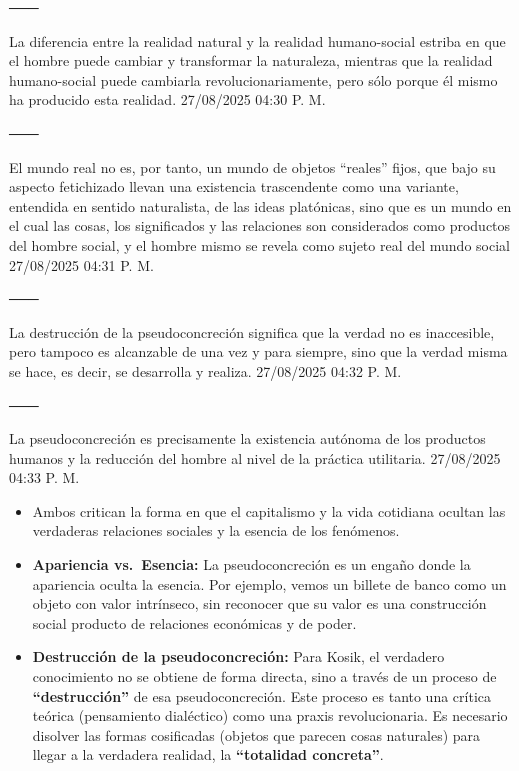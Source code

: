\documentclass[
  letterpaper,
  DIV=11,
  numbers=noendperiod]{scrreprt}
\providecommand{\tightlist}{%
  \setlength{\itemsep}{0pt}\setlength{\parskip}{0pt}}\usepackage{longtable,booktabs,array}
\begin{document}
───

La diferencia entre la realidad natural y la realidad humano-social
estriba en que el hombre puede cambiar y transformar la naturaleza,
mientras que la realidad humano-social puede cambiarla
revolucionariamente, pero sólo porque él mismo ha producido esta
realidad. 27/08/2025 04:30 P. M.

───

El mundo real no es, por tanto, un mundo de objetos ``reales'' fijos,
que bajo su aspecto fetichizado llevan una existencia trascendente como
una variante, entendida en sentido naturalista, de las ideas platónicas,
sino que es un mundo en el cual las cosas, los significados y las
relaciones son considerados como productos del hombre social, y el
hombre mismo se revela como sujeto real del mundo social 27/08/2025
04:31 P. M.

───

La destrucción de la pseudoconcreción significa que la verdad no es
inaccesible, pero tampoco es alcanzable de una vez y para siempre, sino
que la verdad misma se hace, es decir, se desarrolla y realiza.
27/08/2025 04:32 P. M.

───

La pseudoconcreción es precisamente la existencia autónoma de los
productos humanos y la reducción del hombre al nivel de la práctica
utilitaria. 27/08/2025 04:33 P. M.

\begin{itemize}
\item
  Ambos critican la forma en que el capitalismo y la vida cotidiana
  ocultan las verdaderas relaciones sociales y la esencia de los
  fenómenos.
\item
  \textbf{Apariencia vs.~Esencia:} La pseudoconcreción es un engaño
  donde la apariencia oculta la esencia. Por ejemplo, vemos un billete
  de banco como un objeto con valor intrínseco, sin reconocer que su
  valor es una construcción social producto de relaciones económicas y
  de poder.
\end{itemize}

\begin{itemize}
\tightlist
\item
  \textbf{Destrucción de la pseudoconcreción:} Para Kosik, el verdadero
  conocimiento no se obtiene de forma directa, sino a través de un
  proceso de \textbf{``destrucción''} de esa pseudoconcreción. Este
  proceso es tanto una crítica teórica (pensamiento dialéctico) como una
  praxis revolucionaria. Es necesario disolver las formas cosificadas
  (objetos que parecen cosas naturales) para llegar a la verdadera
  realidad, la \textbf{``totalidad concreta''}.
\end{itemize}
\end{document}

